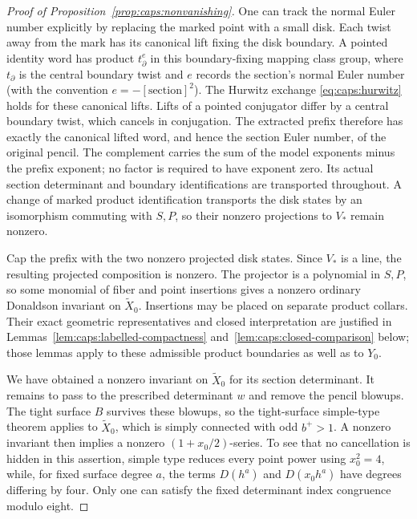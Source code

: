 \begin{proof}[Proof of Proposition~\ref{prop:caps:nonvanishing}]
One can track the normal Euler number explicitly by replacing the marked
point with a small disk.  Each twist away from the mark has its canonical
lift fixing the disk boundary.  A pointed identity word has product
$t_\partial^e$ in this boundary-fixing mapping class group, where
$t_\partial$ is the central boundary twist and $e$ records the section's
normal Euler number (with the convention $e=-[\text{section}]^2$).
The Hurwitz exchange \eqref{eq:caps:hurwitz} holds for these canonical
lifts.  Lifts of a pointed conjugator differ by a central boundary
twist, which cancels in conjugation.  The extracted prefix therefore has
exactly the canonical lifted word, and hence the section Euler number,
of the original pencil.  The complement carries the sum of the model
exponents minus the prefix exponent; no factor is required
to have exponent zero.  Its actual section determinant and boundary
identifications are transported throughout.  A change of marked product
identification transports the disk states by an isomorphism commuting
with $S,P$, so their nonzero projections to $V_*$ remain nonzero.

Cap the prefix with the two nonzero projected disk states.  Since
$V_*$ is a line, the resulting projected composition is nonzero.
The projector is a polynomial in $S,P$, so some monomial of fiber and
point insertions gives a nonzero ordinary Donaldson invariant on
$\widetilde X_0$.  Insertions may be placed on separate product collars.
Their exact geometric representatives and closed interpretation are
justified in Lemmas~\ref{lem:caps:labelled-compactness}
and~\ref{lem:caps:closed-comparison} below; those lemmas apply to these
admissible product boundaries as well as to $Y_0$.

We have obtained a nonzero invariant on $\widetilde X_0$ for its
section determinant.  It remains to pass to the prescribed determinant
$w$ and remove the pencil blowups.  The tight surface $B$ survives these
blowups, so the tight-surface simple-type theorem
\cite[Theorem~8.1]{KronheimerMrowka1995} applies to $\widetilde X_0$, which is simply connected with odd $b^+>1$.
A nonzero invariant then implies a nonzero $(1+x_0/2)$-series.
To see that no cancellation is hidden in this assertion, simple type
reduces every point power using $x_0^2=4$, while, for fixed surface degree
$a$, the terms $D(h^a)$ and $D(x_0h^a)$ have degrees differing by four.
Only one can satisfy the fixed determinant index congruence modulo eight.


\end{proof}
